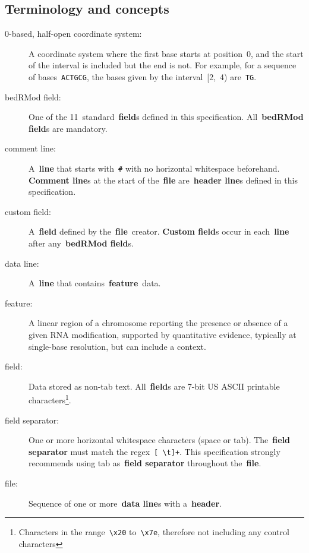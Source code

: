 \documentclass[11pt]{article}
\begin{document}
\subsection{Terminology and concepts}\label{sec:terms}
\begin{description}
\item[0-based, half-open coordinate system:]
  A coordinate system where the first base starts at position~0, and the start of the interval is included but the end is not.
  For example, for a sequence of bases~\texttt{ACTGCG}, the bases given by the interval~[2,~4) are~\texttt{TG}. %

\item[\acs{bedRMod} field:]
  One of the 11~standard~\textbf{field}s defined in this specification.
  All~\textbf{\acs{bedRMod} field}s are mandatory.

\item[comment line:]
  A~\textbf{line} that starts with~\texttt{\#} with no horizontal whitespace beforehand. \textbf{Comment line}s at the start of 
  the~\textbf{file} are~\textbf{header line}s defined in this specification.

\item[custom field:]
  A~\textbf{field} defined by the~\textbf{file}~creator.
  \textbf{Custom field}s occur in each~\textbf{line} after any~\textbf{\acs{bedRMod} field}s.

\item[data line:]
  A~\textbf{line} that contains~\textbf{feature}~data.

\item[feature:]
  A linear region of a chromosome reporting the presence or absence of a given RNA modification, supported by quantitative evidence, typically at single-base resolution, but can include a context.

\item[field:]
  Data stored as non-tab text.
  All~\textbf{field}s are 7-bit US \ac{ASCII} printable characters\footnote{Characters in the range~\texttt{{\textbackslash}x20} to~\texttt{{\textbackslash}x7e}, therefore not including any control characters}.

\item[field separator:]
  One or more horizontal whitespace characters (space or tab).
  The~\textbf{field separator} must match the \ac{regex}~\texttt{[ {\textbackslash}t]+}.
  This specification strongly recommends using tab as~\textbf{field separator} throughout the~\textbf{file}.

\item[file:]
  Sequence of one or more~\textbf{data line}s with a~\textbf{header}.


\end{description}
\end{document}
